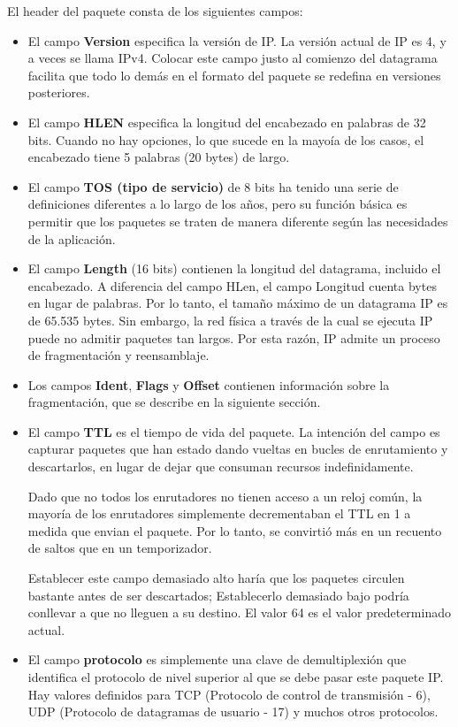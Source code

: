 El header del paquete consta de los siguientes campos:
\begin{itemize}
  \item El campo \textbf{Version} especifica la versión de IP. La versión actual de IP es 4, y a veces se llama IPv4. Colocar este campo justo al comienzo del datagrama facilita que todo lo demás en el formato del paquete se redefina en versiones posteriores.
  \item El campo \textbf{HLEN} especifica la longitud del encabezado en palabras de 32 bits. Cuando no hay opciones, lo que sucede en la mayoía de los casos, el encabezado tiene 5 palabras (20 bytes) de largo.
  \item El campo \textbf{TOS (tipo de servicio)} de 8 bits ha tenido una serie de definiciones diferentes a lo largo de los años, pero su función básica es permitir que los paquetes se traten de manera diferente según las necesidades de la aplicación.
  \item El campo \textbf{Length} (16 bits) contienen la longitud del datagrama, incluido el encabezado. A diferencia del campo HLen, el campo Longitud cuenta bytes en lugar de palabras. Por lo tanto, el tamaño máximo de un datagrama IP es de 65.535 bytes. Sin embargo, la red física a través de la cual se ejecuta IP puede no admitir paquetes tan largos. Por esta razón, IP admite un proceso de fragmentación y reensamblaje.
  \item Los campos \textbf{Ident}, \textbf{Flags} y \textbf{Offset} contienen información sobre la fragmentación, que se describe en la siguiente sección.
  \item El campo \textbf{TTL} es el tiempo de vida del paquete. La intención del campo es capturar paquetes que han estado dando vueltas en bucles de enrutamiento y descartarlos, en lugar de dejar que consuman recursos indefinidamente.

  Dado que no todos los enrutadores no tienen acceso a un reloj común, la mayoría de los enrutadores simplemente decrementaban el TTL en 1 a medida que envian el paquete. Por lo tanto, se convirtió más en un recuento de saltos que en un temporizador.

  Establecer este campo demasiado alto haría que los paquetes circulen bastante antes de ser descartados; Establecerlo demasiado bajo podría conllevar a que no lleguen a su destino. El valor 64 es el valor predeterminado actual.

  \item El campo \textbf{protocolo} es simplemente una clave de demultiplexión que identifica el protocolo de nivel superior al que se debe pasar este paquete IP. Hay valores definidos para TCP (Protocolo de control de transmisión - 6), UDP (Protocolo de datagramas de usuario - 17) y muchos otros protocolos.
  

\end{itemize}
